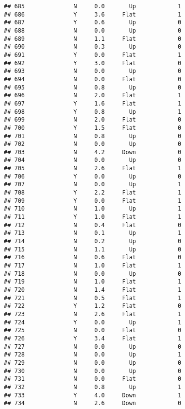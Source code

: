 \documentclass[
]{article}
\begin{document}
\begin{verbatim}
## 685              N     0.0       Up            1
## 686              Y     3.6     Flat            1
## 687              Y     0.6       Up            0
## 688              N     0.0       Up            0
## 689              N     1.1     Flat            0
## 690              N     0.3       Up            0
## 691              Y     0.0     Flat            1
## 692              Y     3.0     Flat            0
## 693              N     0.0       Up            0
## 694              N     0.0     Flat            0
## 695              N     0.8       Up            0
## 696              N     2.0     Flat            1
## 697              Y     1.6     Flat            1
## 698              Y     0.8       Up            1
## 699              N     2.0     Flat            0
## 700              Y     1.5     Flat            0
## 701              N     0.8       Up            0
## 702              N     0.0       Up            0
## 703              N     4.2     Down            0
## 704              N     0.0       Up            0
## 705              N     2.6     Flat            1
## 706              Y     0.0       Up            0
## 707              N     0.0       Up            1
## 708              Y     2.2     Flat            1
## 709              Y     0.0     Flat            1
## 710              N     1.0       Up            1
## 711              Y     1.0     Flat            1
## 712              N     0.4     Flat            0
## 713              N     0.1       Up            1
## 714              N     0.2       Up            0
## 715              N     1.1       Up            0
## 716              N     0.6     Flat            0
## 717              N     1.0     Flat            1
## 718              N     0.0       Up            0
## 719              N     1.0     Flat            1
## 720              N     1.4     Flat            1
## 721              N     0.5     Flat            1
## 722              Y     1.2     Flat            0
## 723              N     2.6     Flat            1
## 724              Y     0.0       Up            1
## 725              N     0.0     Flat            0
## 726              Y     3.4     Flat            1
## 727              N     0.0       Up            0
## 728              N     0.0       Up            1
## 729              N     0.0       Up            0
## 730              N     0.0       Up            0
## 731              N     0.0     Flat            0
## 732              N     0.8       Up            1
## 733              Y     4.0     Down            1
## 734              N     2.6     Down            0

\end{verbatim}
\end{document}
